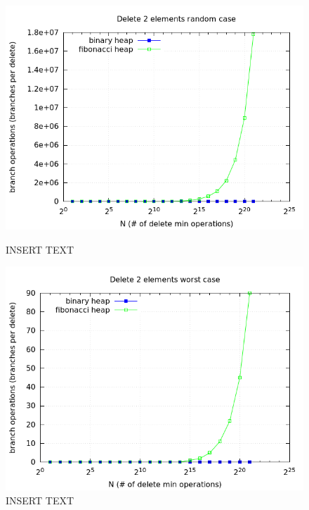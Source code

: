 \documentclass[a4paper,oneside,article,11pt]{memoir}
\begin{document}
\begin{figure}[H]
\centering
\begin{minipage}{0.48\columnwidth}
  \centering
  \includegraphics[width=\linewidth]{../res/delmin/delmin_del_2_branch_random.png}%
  \caption{INSERT TEXT}
  \label{fig:delmin_2_random_branch}
\end{minipage}%
\hfill
\begin{minipage}{0.48\columnwidth}
  \centering
  \includegraphics[width=\linewidth]{../res/delmin/delmin_del_2_branch_worst.png}%
  \caption{INSERT TEXT}
  \label{fig:delmin_2_worst_branch}
\end{minipage}
\end{figure}
\end{document}
